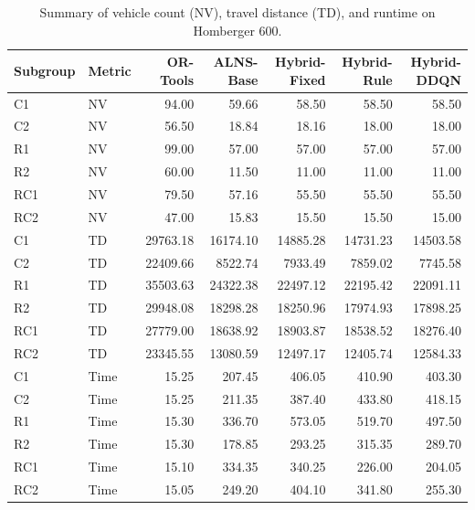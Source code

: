 \begin{table}[htbp]
\centering
\caption{Summary of vehicle count (NV), travel distance (TD), and runtime on Homberger 600.}
\label{tab:results_homberger_600}
\begin{tabular}{llrrrrr}
\hline
\textbf{Subgroup} & \textbf{Metric} & \textbf{OR-Tools} & \textbf{ALNS-Base} & \textbf{Hybrid-Fixed} & \textbf{Hybrid-Rule} & \textbf{Hybrid-DDQN} \\ \hline
C1 & NV & 94.00 & 59.66 & 58.50 & 58.50 & 58.50 \\
C2 & NV & 56.50 & 18.84 & 18.16 & 18.00 & 18.00 \\
R1 & NV & 99.00 & 57.00 & 57.00 & 57.00 & 57.00 \\
R2 & NV & 60.00 & 11.50 & 11.00 & 11.00 & 11.00 \\
RC1 & NV & 79.50 & 57.16 & 55.50 & 55.50 & 55.50 \\
RC2 & NV & 47.00 & 15.83 & 15.50 & 15.50 & 15.00 \\
C1 & TD & 29763.18 & 16174.10 & 14885.28 & 14731.23 & 14503.58 \\
C2 & TD & 22409.66 & 8522.74 & 7933.49 & 7859.02 & 7745.58 \\
R1 & TD & 35503.63 & 24322.38 & 22497.12 & 22195.42 & 22091.11 \\
R2 & TD & 29948.08 & 18298.28 & 18250.96 & 17974.93 & 17898.25 \\
RC1 & TD & 27779.00 & 18638.92 & 18903.87 & 18538.52 & 18276.40 \\
RC2 & TD & 23345.55 & 13080.59 & 12497.17 & 12405.74 & 12584.33 \\
C1 & Time & 15.25 & 207.45 & 406.05 & 410.90 & 403.30 \\
C2 & Time & 15.25 & 211.35 & 387.40 & 433.80 & 418.15 \\
R1 & Time & 15.30 & 336.70 & 573.05 & 519.70 & 497.50 \\
R2 & Time & 15.30 & 178.85 & 293.25 & 315.35 & 289.70 \\
RC1 & Time & 15.10 & 334.35 & 340.25 & 226.00 & 204.05 \\
RC2 & Time & 15.05 & 249.20 & 404.10 & 341.80 & 255.30 \\
\hline
\end{tabular}
\end{table}

